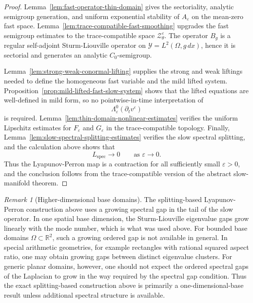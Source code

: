 \documentclass[11pt]{article}
\theoremstyle{definition}
\theoremstyle{remark}
\newtheorem{remark}[theorem]{Remark}
\numberwithin{equation}{section}
\newcommand{\mc}[1]{\mathcal{#1}}
\begin{document}
\begin{proof}
Lemma~\ref{lem:fast-operator-thin-domain} gives the sectoriality, analytic
semigroup generation, and uniform exponential stability of \(A_\varepsilon\) on
the mean-zero fast space. Lemma~\ref{lem:trace-compatible-fast-smoothing}
upgrades the fast semigroup estimates to the trace-compatible space
\(\mc Z_\theta^\varepsilon\). The operator \(B_g\) is a regular self-adjoint
Sturm-Liouville operator on \(\mathcal Y=L^2(\Omega,g\,dx)\), hence it is
sectorial and generates an analytic \(C_0\)-semigroup.

Lemma~\ref{lem:strong-weak-conormal-lifting} supplies the strong and weak
liftings needed to define the homogeneous fast variable and the mild lifted
system. Proposition~\ref{prop:mild-lifted-fast-slow-system} shows that the
lifted equations are well-defined in mild form, so no pointwise-in-time
interpretation of
\[
\Lambda_\varepsilon^0(\partial_tv^\varepsilon)
\]
is required. Lemma~\ref{lem:thin-domain-nonlinear-estimates} verifies the
uniform Lipschitz estimates for \(F_\varepsilon\) and \(G_\varepsilon\) in the
trace-compatible topology. Finally,
Lemma~\ref{lem:slow-spectral-splitting-estimates} verifies the slow spectral
splitting, and the calculation above shows that
\[
L_{\mathrm{spec}}\to0
\qquad\text{as }\varepsilon\to0.
\]
Thus the Lyapunov-Perron map is a contraction for all sufficiently small
\(\varepsilon>0\), and the conclusion follows from the trace-compatible version
of the abstract slow-manifold theorem.
\end{proof}

\begin{remark}[Higher-dimensional base domains]
The splitting-based Lyapunov-Perron construction above uses a growing spectral
gap in the tail of the slow operator. In one spatial base dimension, the
Sturm-Liouville eigenvalue gaps grow linearly with the mode number, which is
what was used above. For bounded base domains
\(\Omega\subset\mathbb R^2\), such a growing ordered gap is not available in
general. In special arithmetic geometries, for example rectangles with rational
squared aspect ratio, one may obtain growing gaps between distinct eigenvalue
clusters. For generic planar domains, however, one should not expect the
ordered spectral gaps of the Laplacian to grow in the way required by the
spectral gap condition. Thus the exact splitting-based construction above is
primarily a one-dimensional-base result unless additional spectral structure is
available.
\end{remark}
\end{document}
